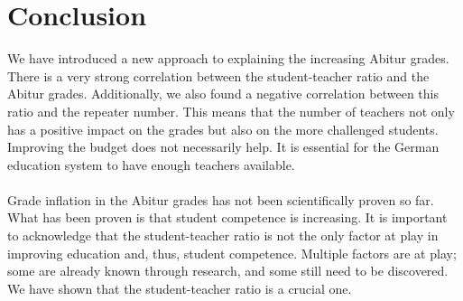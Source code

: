 \section{Conclusion}
We have introduced a new approach to explaining the increasing Abitur grades. There is a very strong correlation between the student-teacher ratio and the Abitur grades. Additionally, we also found a negative correlation between this ratio and the repeater number. This means that the number of teachers not only has a positive impact on the grades but also on the more challenged students. Improving the budget does not necessarily help. It is essential for the German education system to have enough teachers available. \\\\
Grade inflation in the Abitur grades has not been scientifically proven so far. What has been proven is that student competence is increasing. It is important to acknowledge that the student-teacher ratio is not the only factor at play in improving education and, thus, student competence. Multiple factors are at play; some are already known through research, and some still need to be discovered. We have shown that the student-teacher ratio is a crucial one.
